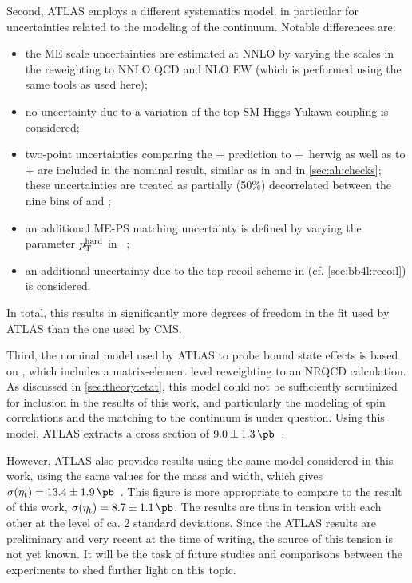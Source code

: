 Second, ATLAS employs a different systematics model, in particular for uncertainties related to the modeling of the \ttbar continuum. Notable differences are:
\begin{itemize}
\item the ME scale uncertainties are estimated at NNLO by varying the scales in the reweighting to NNLO QCD and NLO EW (which is performed using the same tools as used here);
\item no uncertainty due to a variation of the top-SM Higgs Yukawa coupling is considered;
\item two-point uncertainties comparing the \hvq+ \pythia prediction to \hvq+\ herwig as well as to \bbfourl+ \pythia are included in the nominal result, similar as in  and in \cref{sec:ah:checks}; these uncertainties are treated as partially (50\%) decorrelated between the nine bins of \chel and \chan;
\item an additional ME-PS matching uncertainty is defined by varying the parameter $p_{\mathrm{T}}^{\mathrm{hard}}$ in \pythia~\cite{Pythia:2022};
\item an additional uncertainty due to the top recoil scheme in \pythia (cf. \cref{sec:bb4l:recoil}) is considered.
\end{itemize}
In total, this results in significantly more degrees of freedom in the fit used by ATLAS than the one used by CMS.

Third, the nominal model used by ATLAS to probe \ttbar bound state effects is based on , which includes a matrix-element level reweighting to an NRQCD calculation. As discussed in \cref{sec:theory:etat}, this model could not be sufficiently scrutinized for inclusion in the results of this work, and particularly the modeling of spin correlations and the matching to the \ttbar continuum is under question. Using this model, ATLAS extracts a cross section of $9.0 \pm \SI{1.3}{\pb}$~\cite{ATLAS:CONF-2025-008}. 

However, ATLAS also provides results using the same \etat model considered in this work, using the same values for the \etat mass and width, which gives $\sigetat = 13.4 \pm \SI{1.9}{\pb}$~\cite{ATLAS:CONF-2025-008}. This figure is more appropriate to compare to the result of this work, $\sigetat = 8.7 \pm \SI{1.1}{\pb}$. The results are thus in tension with each other at the level of ca. 2 standard deviations. Since the ATLAS results are preliminary and very recent at the time of writing, the source of this tension is not yet known. It will be the task of future studies and comparisons between the experiments to shed further light on this topic.


